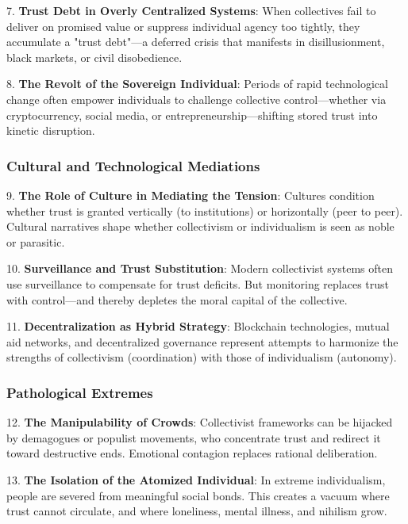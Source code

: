 \documentclass[11pt,oneside]{book}
\begin{document}
7. \textbf{Trust Debt in Overly Centralized Systems}: When collectives fail to deliver on promised value or suppress individual agency too tightly, they accumulate a "trust debt"—a deferred crisis that manifests in disillusionment, black markets, or civil disobedience.



8. \textbf{The Revolt of the Sovereign Individual}: Periods of rapid technological change often empower individuals to challenge collective control—whether via cryptocurrency, social media, or entrepreneurship—shifting stored trust into kinetic disruption.


\subsubsection{Cultural and Technological Mediations}


9. \textbf{The Role of Culture in Mediating the Tension}: Cultures condition whether trust is granted vertically (to institutions) or horizontally (peer to peer). Cultural narratives shape whether collectivism or individualism is seen as noble or parasitic.



10. \textbf{Surveillance and Trust Substitution}: Modern collectivist systems often use surveillance to compensate for trust deficits. But monitoring replaces trust with control—and thereby depletes the moral capital of the collective.



11. \textbf{Decentralization as Hybrid Strategy}: Blockchain technologies, mutual aid networks, and decentralized governance represent attempts to harmonize the strengths of collectivism (coordination) with those of individualism (autonomy).


\subsubsection{Pathological Extremes}


12. \textbf{The Manipulability of Crowds}: Collectivist frameworks can be hijacked by demagogues or populist movements, who concentrate trust and redirect it toward destructive ends. Emotional contagion replaces rational deliberation.



13. \textbf{The Isolation of the Atomized Individual}: In extreme individualism, people are severed from meaningful social bonds. This creates a vacuum where trust cannot circulate, and where loneliness, mental illness, and nihilism grow.
\end{document}
